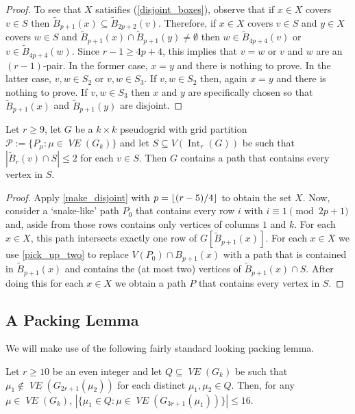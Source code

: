 \documentclass{patmorin}
\DeclareMathOperator{\interior}{Int}
\DeclareMathOperator{\VE}{\mathit{VE}}
\begin{document}
\begin{proof}
  To see that $X$ satisifies (\ref{disjoint_boxes}), observe that if $x\in X$ covers $v\in S$ then $\tilde{B}_{p+1}(x)\subseteq \tilde{B}_{2p+2}(v)$. Therefore, if $x\in X$ covers $v\in S$ and $y\in X$ covers $w\in S$ and $\tilde{B}_{p+1}(x)\cap \tilde{B}_{p+1}(y)\neq\emptyset$ then $w\in \tilde{B}_{4p+4}(v)$ or $v\in \tilde{B}_{4p+4}(w)$.  Since $r-1 \ge 4p+4$, this implies that $v=w$ or $v$ and $w$ are an $(r-1)$-pair.  In the former case, $x=y$ and there is nothing to prove. In the latter case, $v,w\in S_2$ or $v,w\in S_3$.  If $v,w\in S_2$ then, again $x=y$ and there is nothing to prove.  If $v,w\in S_3$ then $x$ and $y$ are specifically chosen so that $\tilde{B}_{p+1}(x)$ and $\tilde{B}_{p+1}(y)$ are disjoint.
\end{proof}


\begin{lem}\label{pick_up_everything}
  Let $r\ge 9$, let $G$ be a $k\times k$ pseudogrid with grid partition $\mathcal{P}:=\{P_\mu:\mu\in\VE(G_k)\}$ and let $S\subseteq V(\interior_r(G))$ be such that $|\tilde{B}_{r}(v)\cap S|\le 2$ for each $v\in S$. Then $G$ contains a path that contains every vertex in $S$.
\end{lem}

\begin{proof}
  Apply \cref{make_disjoint} with $p={\lfloor (r-5)/4 \rfloor}$ to obtain the set $X$.  Now, consider a `snake-like' path $P_0$ that contains every row $i$ with $i\equiv 1\pmod{2p+1}$ and, aside from those rows contains only vertices of columns $1$ and $k$.   For each $x\in X$, this path intersects exactly one row of $G[\tilde{B}_{p+1}(x)]$.  For each $x\in X$ we use \cref{pick_up_two} to replace $V(P_0)\cap B_{p+1}(x)$ with a path that is contained in $\tilde{B}_{p+1}(x)$ and contains the (at most two) vertices of $\tilde{B}_{p+1}(x)\cap S$.  After doing this for each $x\in X$ we obtain a path $P$ that contains every vertex in $S$.
\end{proof}

\subsection{A Packing Lemma}
\label{packing_lemma_sec}

We will make use of the following fairly standard looking packing lemma.

\begin{lem}\label{packing_lemma}
  Let $r\ge 10$ be an even integer and let $Q\subseteq \VE(G_k)$ be such that $\mu_1\not\in \VE(G_{2r+1}(\mu_2))$ for each distinct $\mu_1,\mu_2\in Q$.  Then, for any $\mu\in \VE(G_k)$,
  $|\{\mu_1\in Q: \mu\in \VE(G_{3r+1}(\mu_1))\}| \le 16$.
\end{lem}
\end{document}
